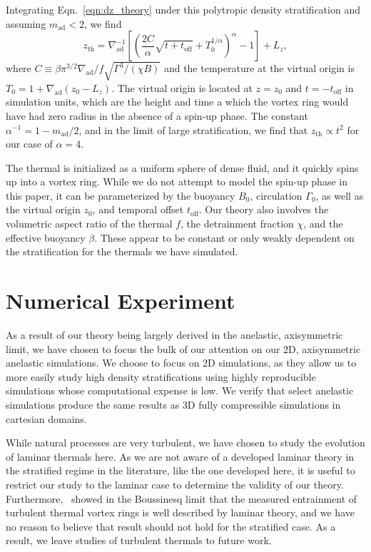 \documentclass[twocolumn, amsmath, amsfonts, amssymb, trackchanges]{aastex62}
\newcommand{\grad}{\ensuremath{\nabla}}
\newcommand{\LJ}{\citetalias{lecoanet&jeevanjee2018}}
\begin{document}
Integrating Eqn.~\ref{eqn:dz_theory} under this polytropic density stratification and assuming $m_{\text{ad}} < 2$, we find
\begin{equation}
z_{\text{th}} = \grad_{\text{ad}}^{-1}\left[\left(\frac{2C}{ \alpha } \sqrt{t + t_{\text{off}}} + T_0^{1/\alpha}  \right)^{\alpha} - 1\right] + L_z,
\label{eqn:theory_z}
\end{equation}
where $C \equiv \beta \pi^{3/2} \grad_{\text{ad}} / f \sqrt{\Gamma^3/(\chi B)}$ and the temperature at the virtual origin is $T_0 = 1 + \grad_{\text{ad}}(z_0 - L_z)$.
The virtual origin is located at $z = z_0$ and $t = -t_{\text{off}}$ in simulation units, which are the height and time a which the vortex ring would have had zero radius in the absence of a spin-up phase.
The constant $\alpha^{-1} = 1 - m_{\text{ad}}/2$, and in the limit of large stratification, we find that $z_{\text{th}} \propto t^2$ for our case of $\alpha = 4$. 

The thermal is initialized as a uniform sphere of dense fluid, and it quickly spins up into a vortex ring. 
While we do not attempt to model the spin-up phase in this paper, it can be parameterized by the buoyancy $B_0$, circulation $\Gamma_0$, as well as the virtual origin $z_0$, and temporal offset $t_{\text{off}}$. 
Our theory also involves the volumetric aspect ratio of the thermal $f$, the detrainment fraction $\chi$, and the effective buoyancy $\beta$. 
These appear to be constant or only weakly dependent on the stratification for the thermals we have simulated.


\section{Numerical Experiment} 
\label{sec:experiment}
As a result of our theory being largely derived in the anelastic, axisymmetric limit, we have chosen to focus the bulk of our attention on our 2D, axisymmetric anelastic simulations.
We choose to focus on 2D simulations, as they allow us to more easily study high density stratifications using highly reproducible simulations whose computational expense is low.
We verify that select anelastic simulations produce the same results as 3D fully compressible simulations in cartesian domains. 

While natural processes are very turbulent, we have chosen to study the evolution of laminar thermals here. 
As we are not aware of a developed laminar theory in the stratified regime in the literature, like the one developed here, it is useful to restrict our study to the laminar case to determine the validity of our theory.
Furthermore, \LJ\, showed in the Boussinesq limit that the measured entrainment of turbulent thermal vortex rings is well described by laminar theory, and we have no reason to believe that result should not hold for the stratified case.
As a result, we leave studies of turbulent thermals to future work.
\end{document}

